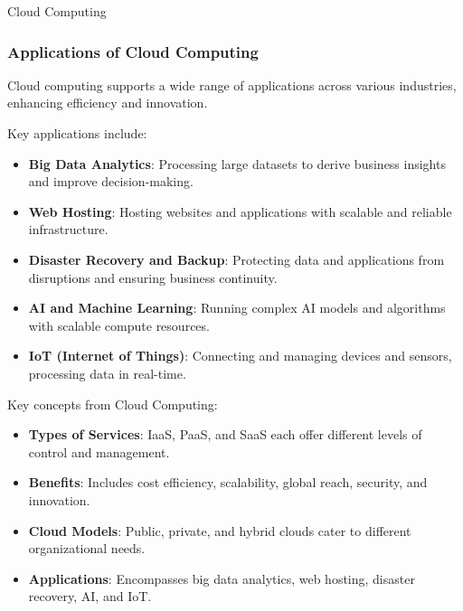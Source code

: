 \begin{notes}{Cloud Computing}
\begin{highlight}
    \end{highlight}
    
    \subsubsection*{Applications of Cloud Computing}
    
    Cloud computing supports a wide range of applications across various industries, enhancing efficiency and innovation.
    
    \begin{highlight}
    
        Key applications include:
        
        \begin{itemize}
            \item \textbf{Big Data Analytics}: Processing large datasets to derive business insights and improve decision-making.
            \item \textbf{Web Hosting}: Hosting websites and applications with scalable and reliable infrastructure.
            \item \textbf{Disaster Recovery and Backup}: Protecting data and applications from disruptions and ensuring business continuity.
            \item \textbf{AI and Machine Learning}: Running complex AI models and algorithms with scalable compute resources.
            \item \textbf{IoT (Internet of Things)}: Connecting and managing devices and sensors, processing data in real-time.
        \end{itemize}
    
    \end{highlight}
    
    \begin{highlight}
    
        Key concepts from Cloud Computing:
        
        \begin{itemize}
            \item \textbf{Types of Services}: IaaS, PaaS, and SaaS each offer different levels of control and management.
            \item \textbf{Benefits}: Includes cost efficiency, scalability, global reach, security, and innovation.
            \item \textbf{Cloud Models}: Public, private, and hybrid clouds cater to different organizational needs.
            \item \textbf{Applications}: Encompasses big data analytics, web hosting, disaster recovery, AI, and IoT.
        \end{itemize}
        
    \end{highlight}
\end{notes}
